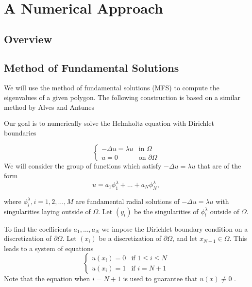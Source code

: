 \documentclass[12pt]{report}
\numberwithin{definition}{section}
\begin{document}
\break



\break

\chapter{A Numerical Approach}
\break

\section{Overview}


\break

\section {Method of Fundamental Solutions}

We will use the method of fundamental solutions (MFS) to compute the eigenvalues of a given polygon.
The following construction is based on a similar method by Alves and Antunes \cite{fund}

Our goal is to numerically solve the Helmholtz equation with Dirichlet boundaries

\[
  \begin{cases}
    - \Delta u = \lambda u  & \text{in } \Omega \\
    u = 0 & \text{on } \partial \Omega
  \end{cases}
\] 
We will consider the group of functions which satisfy $- \Delta u = \lambda u$ that are of the form
\[
  u = a_1 \phi_{1}^\lambda + \ldots + a_{N} \phi_{N}^\lambda
,\] 

where $\phi_{i}^\lambda, i = 1,2,\ldots,M$ are fundamental radial solutions of $- \Delta u = \lambda u$ with singularities laying outside of $\Omega$.
Let $(y_{i})$ be the singularities of $\phi_{i}^\lambda$ outside of $\Omega$.

To find the coefficients $a_1,\ldots,a_{N}$ we impose the Dirichlet boundary condition on a discretization of $\partial \Omega$.
Let $(x_{i})$ be a discretization of $\partial \Omega$, and let $x_{N+1} \in \Omega$.
This leads to a system of equations 
\[
  \begin{cases}
    u(x_{i}) = 0 & \text{if } 1 \leq i \leq N \\
    u(x_{i}) = 1 & \text{if } i = N + 1 
  \end{cases}
\] 
Note that the equation when $i = N + 1$ is used to guarantee that $u(x) \not\equiv 0$ \cite{fund2}.
\end{document}
